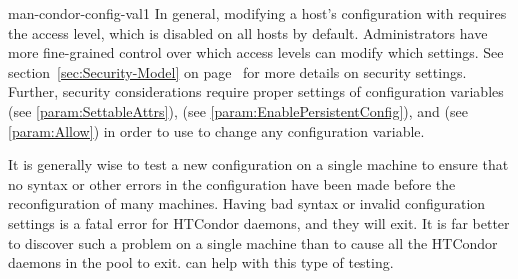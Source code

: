 \begin{ManPage}{}{man-condor-config-val}{1}
In general, modifying a host's configuration with
requires the  access level, which is disabled on all
hosts by default.
Administrators have more
fine-grained control over which access levels can modify which
settings.
See section~\ref{sec:Security-Model} on
page~\pageref{sec:Security-Model} for more details on security settings.
Further, security considerations require proper settings of
configuration variables
 (see \ref{param:SettableAttrs}),
 (see \ref{param:EnablePersistentConfig}),
and  (see \ref{param:Allow})
in order to use  to change any configuration variable.

It is generally wise to test a new configuration on a single
machine to ensure that no syntax or other errors in the
configuration have been made before the reconfiguration of many machines.  
Having bad syntax or invalid configuration settings is a fatal error
for HTCondor daemons, and they will exit.
It is far better to discover such a problem on a single machine than to
cause all the HTCondor daemons in the pool to exit.
 can help with this type of testing.


\end{ManPage}
